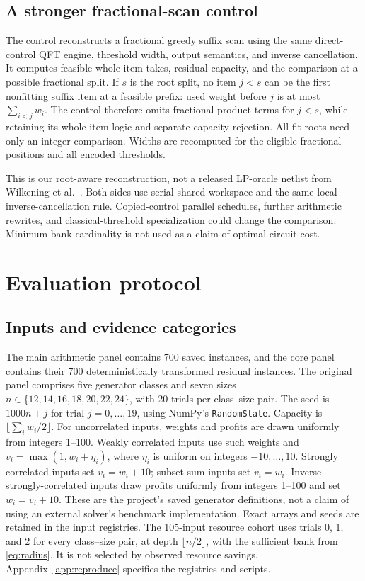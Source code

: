 \documentclass[referee,pdflatex,sn-mathphys-num]{sn-jnl}
\theoremstyle{thmstyleone}
\theoremstyle{thmstyletwo}
\begin{document}
\subsection{A stronger fractional-scan control}
The control reconstructs a fractional greedy suffix scan using the same direct-control QFT engine, threshold width, output semantics, and inverse cancellation. It computes feasible whole-item takes, residual capacity, and the comparison at a possible fractional split. If $s$ is the root split, no item $j<s$ can be the first nonfitting suffix item at a feasible prefix: used weight before $j$ is at most $\sum_{i<j}w_i$. The control therefore omits fractional-product terms for $j<s$, while retaining its whole-item logic and separate capacity rejection. All-fit roots need only an integer comparison. Widths are recomputed for the eligible fractional positions and all encoded thresholds.

This is our root-aware reconstruction, not a released LP-oracle netlist from Wilkening et al.\ \cite{wilkening2025,wilkening2025code}. Both sides use serial shared workspace and the same local inverse-cancellation rule. Copied-control parallel schedules, further arithmetic rewrites, and classical-threshold specialization could change the comparison. Minimum-bank cardinality is not used as a claim of optimal circuit cost.

\section{Evaluation protocol}\label{sec:methods}
\subsection{Inputs and evidence categories}
The main arithmetic panel contains 700 saved instances, and the core panel contains their 700 deterministically transformed residual instances. The original panel comprises five generator classes and seven sizes $n\in\{12,14,16,18,20,22,24\}$, with 20 trials per class--size pair. The seed is $1000n+j$ for trial $j=0,\ldots,19$, using NumPy's \texttt{RandomState}. Capacity is $\lfloor\sum_iw_i/2\rfloor$. For uncorrelated inputs, weights and profits are drawn uniformly from integers 1--100. Weakly correlated inputs use such weights and $v_i=\max(1,w_i+\eta_i)$, where $\eta_i$ is uniform on integers $-10,\ldots,10$. Strongly correlated inputs set $v_i=w_i+10$; subset-sum inputs set $v_i=w_i$. Inverse-strongly-correlated inputs draw profits uniformly from integers 1--100 and set $w_i=v_i+10$. These are the project's saved generator definitions, not a claim of using an external solver's benchmark implementation. Exact arrays and seeds are retained in the input registries. The 105-input resource cohort uses trials 0, 1, and 2 for every class--size pair, at depth $\lfloor n/2\rfloor$, with the sufficient bank from \eqref{eq:radius}. It is not selected by observed resource savings. Appendix~\ref{app:reproduce} specifies the registries and scripts.
\end{document}
